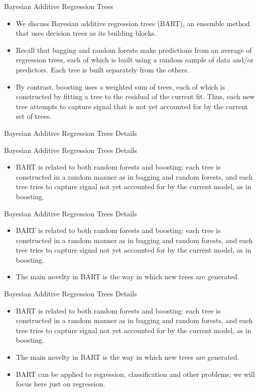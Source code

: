\documentclass[aspectratio=169, 11pt]{beamer}
\begin{document}
\begin{frame}{Bayesian Additive Regression Trees}
\begin{itemize}
    \item We discuss Bayesian additive regression trees (BART), an ensemble method that uses decision trees as its building blocks.
    \item Recall that bagging and random forests make predictions from an average of regression trees, each of which is built using a random sample of data and/or predictors. Each tree is built separately from the others.
    \item By contrast, boosting uses a weighted sum of trees, each of which is constructed by fitting a tree to the residual of the current fit. Thus, each new tree attempts to capture signal that is not yet accounted for by the current set of trees.
\end{itemize}
\end{frame}

\begin{frame}{Bayesian Additive Regression Trees Details}
\end{frame}

\begin{frame}{Bayesian Additive Regression Trees Details}
\begin{itemize}
    \item BART is related to both random forests and boosting: each tree is constructed in a random manner as in bagging and random forests, and each tree tries to capture signal not yet accounted for by the current model, as in boosting.
\end{itemize}
\end{frame}

\begin{frame}{Bayesian Additive Regression Trees Details}
\begin{itemize}
    \item BART is related to both random forests and boosting: each tree is constructed in a random manner as in bagging and random forests, and each tree tries to capture signal not yet accounted for by the current model, as in boosting.
    \item The main novelty in BART is the way in which new trees are generated.
\end{itemize}
\end{frame}

\begin{frame}{Bayesian Additive Regression Trees Details}
\begin{itemize}
    \item BART is related to both random forests and boosting: each tree is constructed in a random manner as in bagging and random forests, and each tree tries to capture signal not yet accounted for by the current model, as in boosting.
    \item The main novelty in BART is the way in which new trees are generated.
    \item BART can be applied to regression, classification and other problems; we will focus here just on regression.
\end{itemize}
\end{frame}
\end{document}

